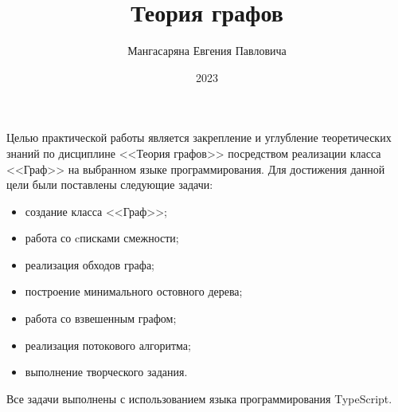 \documentclass[pract,times]{SCWorks}
\begin{document}

\title{Теория графов}






\author{Мангасаряна Евгения Павловича}





\date{2023}

\maketitle

\secNumbering

\tableofcontents

\intro
Целью практической работы является закрепление и углубление теоретических знаний по 
дисциплине <<Теория графов>> посредством реализации класса
<<Граф>> на выбранном языке программирования.
Для достижения данной цели были поставлены следующие задачи:
\begin{itemize}
  \item создание класса <<Граф>>;
  \item работа со cписками смежности;
  \item реализация обходов графа;
  \item построение минимального остовного дерева;
  \item работа со взвешенным графом;
  \item реализация потокового алгоритма;
  \item выполнение творческого задания.
\end{itemize}
Все задачи выполнены с использованием языка программирования TypeScript.
\end{document}
